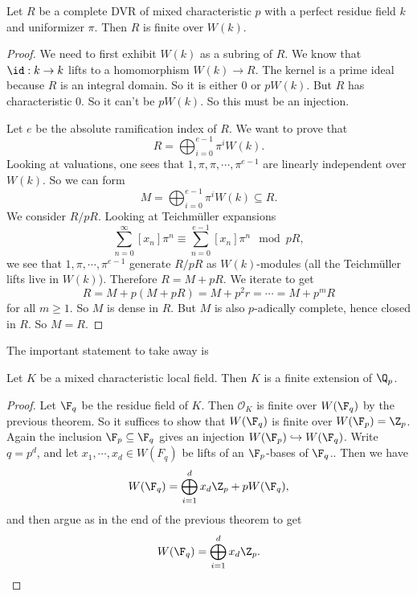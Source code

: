\documentclass[a4paper]{article}
\begin{document}
\begin{thm}
  Let $R$ be a complete DVR of mixed characteristic $p$ with a perfect residue field $k$ and uniformizer $\pi$. Then $R$ is finite over $W(k)$.
\end{thm}

\begin{proof}
  We need to first exhibit $W(k)$ as a subring of $R$. We know that $\id: k \to k$ lifts to a homomorphism $W(k) \to R$. The kernel is a prime ideal because $R$ is an integral domain. So it is either $0$ or $p W(k)$. But $R$ has characteristic $0$. So it can't be $pW(k)$. So this must be an injection.

  Let $e$ be the absolute ramification index of $R$. We want to prove that
  \[
    R = \bigoplus_{i = 0}^{e - 1} \pi^i W(k).
  \]
  Looking at valuations, one sees that $1, \pi, \pi, \cdots, \pi^{e - 1}$ are linearly independent over $W(k)$. So we can form
  \[
    M = \bigoplus_{i = 0}^{e - 1} \pi^i W(k) \subseteq R.
  \]
  We consider $R/pR$. Looking at Teichm\"uller expansions
  \[
    \sum_{n = 0}^\infty [x_n] \pi^n \equiv \sum_{n = 0}^{e - 1} [x_n]\pi^n \mod pR,
  \]
  we see that $1, \pi, \cdots, \pi^{e - 1}$ generate $R/pR$ as $W(k)$-modules (all the Teichm\"uller lifts live in $W(k)$). Therefore $R = M + pR$. We iterate to get
  \[
    R = M + p(M + pR) = M + p^2 r = \cdots = M + p^m R
  \]
  for all $m \geq 1$. So $M$ is dense in $R$. But $M$ is also $p$-adically complete, hence closed in $R$. So $M = R$.
\end{proof}

The important statement to take away is
\begin{cor}
  Let $K$ be a mixed characteristic local field. Then $K$ is a finite extension of $\Q_p$.
\end{cor}

\begin{proof}
  Let $\F_q$ be the residue field of $K$. Then $\mathcal{O}_K$ is finite over $W(\F_q)$ by the previous theorem. So it suffices to show that $W(\F_q)$ is finite over $W(\F_p) = \Z_p$. Again the inclusion $\F_p \subseteq \F_q$ gives an injection $W(\F_p) \hookrightarrow W(\F_q)$. Write $q = p^d$, and let $x_1, \cdots, x_d \in W(F_q)$ be lifts of an $\F_p$-bases of $\F_q$.. Then we have
  \[
    W(\F_q) = \bigoplus_{i = 1}^d x_d \Z_p + p W(\F_q),
  \]
  and then argue as in the end of the previous theorem to get
  \[
    W(\F_q) = \bigoplus_{i = 1}^d x_d \Z_p. \qedhere
  \]
\end{proof}
\end{document}
